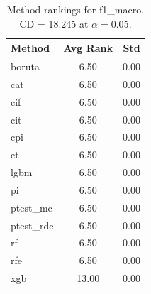 \begin{table}[h]
\centering
\caption{Method rankings for f1_macro. CD = 18.245 at $\alpha=0.05$.}
\label{tab:ranks_f1_macro}
\begin{tabular}{lcc}
\toprule
Method & Avg Rank & Std \\
\midrule
boruta & 6.50 & 0.00 \\
cat & 6.50 & 0.00 \\
cif & 6.50 & 0.00 \\
cit & 6.50 & 0.00 \\
cpi & 6.50 & 0.00 \\
et & 6.50 & 0.00 \\
lgbm & 6.50 & 0.00 \\
pi & 6.50 & 0.00 \\
ptest_mc & 6.50 & 0.00 \\
ptest_rdc & 6.50 & 0.00 \\
rf & 6.50 & 0.00 \\
rfe & 6.50 & 0.00 \\
xgb & 13.00 & 0.00 \\
\bottomrule
\end{tabular}
\end{table}
